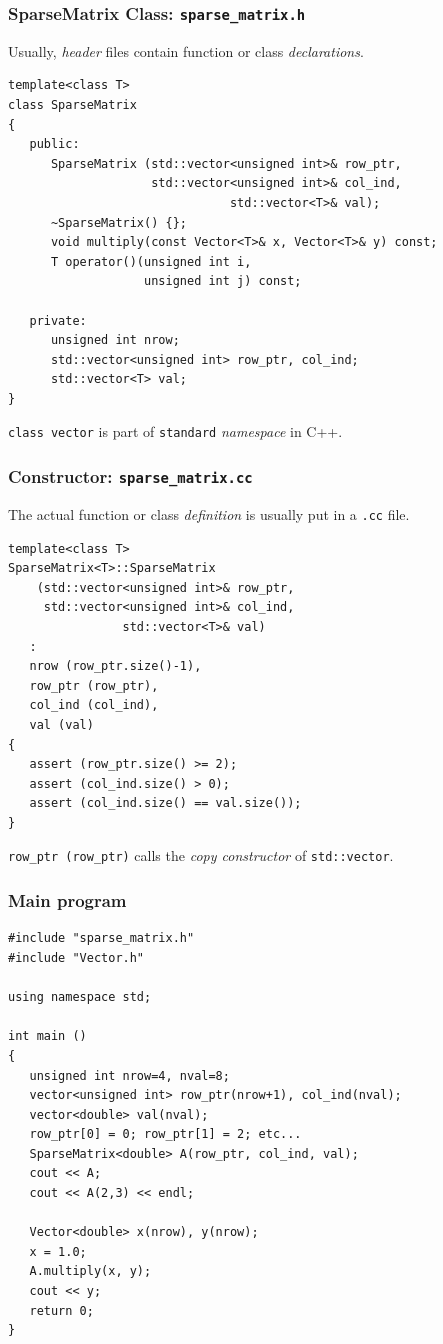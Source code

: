 \documentclass[10pt,xcolor=svgnames]{beamer}
\begin{document}
\begin{frame}[fragile]
\frametitle{SparseMatrix Class: {\tt sparse\_matrix.h}}
Usually, {\em header} files contain function or class {\em declarations}.

\begin{lstlisting}
template<class T>
class SparseMatrix
{
   public:
      SparseMatrix (std::vector<unsigned int>& row_ptr, 
                    std::vector<unsigned int>& col_ind, 
                               std::vector<T>& val);
      ~SparseMatrix() {};
      void multiply(const Vector<T>& x, Vector<T>& y) const;
      T operator()(unsigned int i, 
                   unsigned int j) const;
      
   private:
      unsigned int nrow;
      std::vector<unsigned int> row_ptr, col_ind;
      std::vector<T> val;
}
\end{lstlisting}
{\tt class vector} is part of {\tt standard} {\em namespace} in C++.
\end{frame}
\begin{frame}[fragile]
\frametitle{Constructor: {\tt sparse\_matrix.cc}}

The actual function or class {\em definition} is usually put in a {\tt *.cc} file.

\begin{lstlisting}
template<class T>
SparseMatrix<T>::SparseMatrix 
    (std::vector<unsigned int>& row_ptr, 
     std::vector<unsigned int>& col_ind, 
                std::vector<T>& val)
   :
   nrow (row_ptr.size()-1),
   row_ptr (row_ptr),
   col_ind (col_ind),
   val (val)
{
   assert (row_ptr.size() >= 2);
   assert (col_ind.size() > 0);
   assert (col_ind.size() == val.size());
}
\end{lstlisting}
{\tt row\_ptr (row\_ptr)} calls the {\em copy constructor} of {\tt std::vector}.
\end{frame}
\begin{frame}[fragile]
\frametitle{Main program}

\begin{lstlisting}
#include "sparse_matrix.h"
#include "Vector.h"

using namespace std;

int main ()
{
   unsigned int nrow=4, nval=8;
   vector<unsigned int> row_ptr(nrow+1), col_ind(nval);
   vector<double> val(nval);
   row_ptr[0] = 0; row_ptr[1] = 2; etc...
   SparseMatrix<double> A(row_ptr, col_ind, val);
   cout << A;
   cout << A(2,3) << endl;
   
   Vector<double> x(nrow), y(nrow);
   x = 1.0;
   A.multiply(x, y);
   cout << y;
   return 0;
}
\end{lstlisting}

\end{frame}
\end{document}
